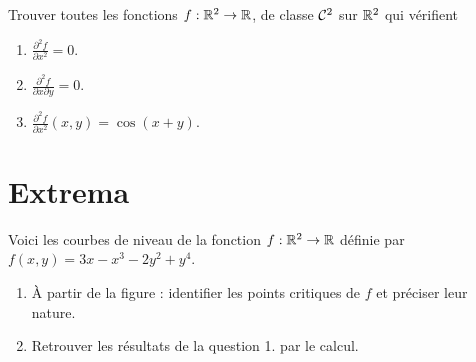 \documentclass{tp_um}
\makeatletter
\newcommand{\miniscule}{\@setfontsize\miniscule{5}{6}}
\makeatother
\begin{document}


\exo{} Trouver toutes les fonctions $f:\mathbb{R}^2\to\mathbb{R}$, de classe $\mathcal{C}^{2}$ sur $\mathbb{R}^2$ qui v\'erifient
\begin{enumerate}
	\item $\frac{\partial^2 f}{\partial x^2} = 0$.
	\item $ \frac{\partial^2 f}{\partial x \partial y} = 0$.
	\item $\frac{\partial^2 f}{\partial x^2}(x,y) = \cos(x+y)$.
\end{enumerate}
%


\section{Extrema}

\exo{} Voici les courbes de niveau de la fonction $f:\mathbb{R}^2 \to \mathbb{R}$ définie par  $f(x,y) = 3x-x^3-2y^2+y^4$.
\begin{center}
	
\end{center}
\begin{enumerate}
	\item \`A partir de la figure : identifier les points critiques de $f$ et préciser leur nature.
	\item Retrouver les résultats de la question 1. par le calcul.
\end{enumerate}
\end{document}

